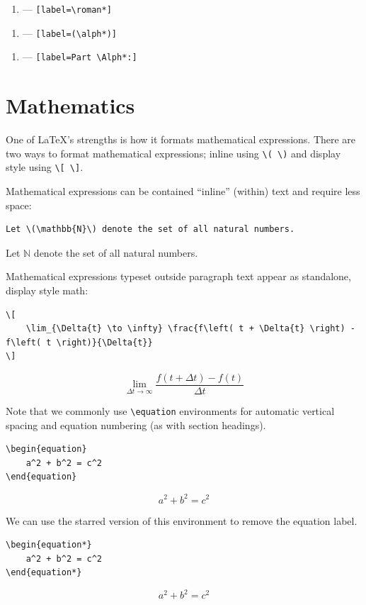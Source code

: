 \documentclass[11pt, twoside]{article}
\begin{document}
\begin{enumerate}[label=\roman*]
    \item --- \lstinline|[label=\roman*]|
\end{enumerate}
\begin{enumerate}[label=(\alph*)]
    \item --- \lstinline|[label=(\alph*)]|
\end{enumerate}
\begin{enumerate}[label=Part \Alph*:]
    \item --- \lstinline|[label=Part \Alph*:]|
\end{enumerate}
\newpage
\section{Mathematics}
One of \LaTeX{}'s strengths is how it formats mathematical expressions.
There are two ways to format mathematical expressions; inline using \lstinline|\( \)| and display style using \lstinline|\[ \]|.

Mathematical expressions can be contained ``inline'' (within) text and require less space:
\begin{lstlisting}
Let \(\mathbb{N}\) denote the set of all natural numbers.
\end{lstlisting}
\begin{outputbox}
    Let \(\mathbb{N}\) denote the set of all natural numbers.
\end{outputbox}
Mathematical expressions typeset outside paragraph text appear as standalone, display style math:
\begin{lstlisting}
\[
    \lim_{\Delta{t} \to \infty} \frac{f\left( t + \Delta{t} \right) - f\left( t \right)}{\Delta{t}}
\]
\end{lstlisting}
\begin{outputbox}
    \[
        \lim_{\Delta{t} \to \infty} \frac{f\left( t + \Delta{t} \right) - f\left( t \right)}{\Delta{t}}
    \]
\end{outputbox}
Note that we commonly use \lstinline|\equation| environments for automatic vertical spacing and equation numbering
(as with section headings).
\begin{lstlisting}
\begin{equation}
    a^2 + b^2 = c^2
\end{equation}
\end{lstlisting}
\begin{outputbox}
    \begin{equation}
        a^2 + b^2 = c^2
    \end{equation}
\end{outputbox}
We can use the starred version of this environment to remove the equation label.
\begin{lstlisting}
\begin{equation*}
    a^2 + b^2 = c^2
\end{equation*}
\end{lstlisting}
\begin{outputbox}
    \begin{equation*}
        a^2 + b^2 = c^2
    \end{equation*}
\end{outputbox}
\end{document}

